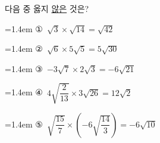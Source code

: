 다음 중 옳지 \underline{않은} 것은?
\par\medskip\par\noindent\hangindent=1.4em {\small ①}\ $\sqrt{3}\times\sqrt{14}=\sqrt{42}$\par\noindent\hangindent=1.4em {\small ②}\ $\sqrt{6}\times5\sqrt{5}=5\sqrt{30}$\par\noindent\hangindent=1.4em {\small ③}\ $-3\sqrt{7}\times2\sqrt{3}=-6\sqrt{21}$\par\noindent\hangindent=1.4em {\small ④}\ $4\sqrt{\dfrac{2}{13}}\times3\sqrt{26}=12\sqrt{2}$\par\noindent\hangindent=1.4em {\small ⑤}\ $\sqrt{\dfrac{15}{7}}\times\left(-6\sqrt{\dfrac{14}{3}}\right)=-6\sqrt{10}$\par\medskip

